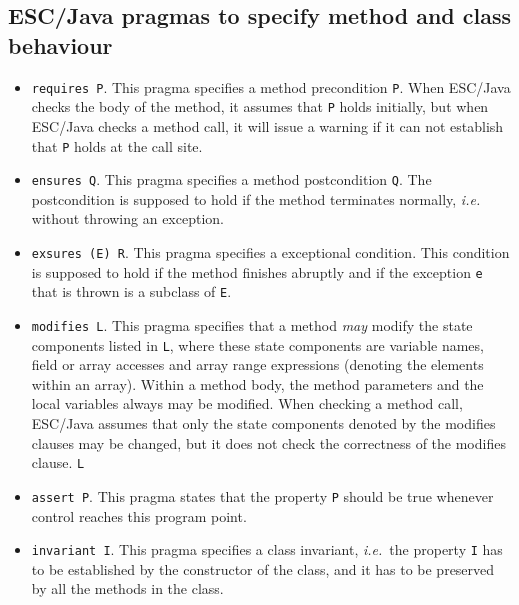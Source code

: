 \documentclass[a4paper]{llncs}
\begin{document}
\subsection{ESC/Java pragmas to specify method and class behaviour}
\begin{itemize}
\item{\texttt{requires P}.}
This pragma specifies a method precondition {\tt P}.
When ESC/Ja\-va checks the body of the
method, it assumes that \texttt{P} holds initially, but when
ESC/Java checks a method call, it will issue a warning if
it can not establish that \texttt{P} holds at the call site.

\item{\texttt{ensures Q}.}
This pragma specifies a method postcondition \texttt{Q}. The
postcondition is supposed to hold if the method terminates normally,
\emph{i.e.}  without throwing an exception.

\item{\texttt{exsures (E) R}.}
This pragma specifies a exceptional condition. This condition is
supposed to hold if the method finishes abruptly and if
the exception \texttt{e} that is thrown is a subclass of \texttt{E}.

\item{\texttt{modifies L}.}
This pragma specifies that a method \emph{may} modify the state
components listed in \texttt{L}, where these state components are
variable names, field or array accesses and array range expressions
(denoting the elements within an array). Within a method body, the
method parameters and the local variables always may be modified. When
checking a method call, ESC/Java assumes that only the state
components denoted by the modifies clauses may be changed, but it
does not check the correctness of the modifies clause.
\texttt{L}

\item{\texttt{assert P}.} This pragma states that the property
\texttt{P} should be true whenever control reaches this program point.

\item{\texttt{invariant I}.} This pragma specifies a class invariant,
\emph{i.e.}~the property \texttt{I} has to be established by the
constructor of the class, and it has to be preserved by all the
methods in the class. 
\end{itemize}
\end{document}
